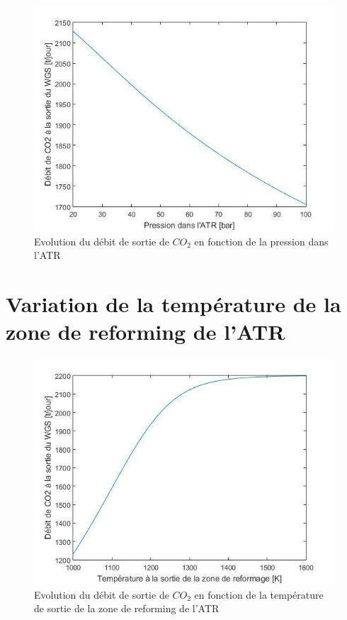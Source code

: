 \documentclass[12pt]{report}
\begin{document}
\begin{figure}[H]
\begin{center}
\includegraphics[scale=0.6]{debit_CO2_pression_ATR}
\caption{Evolution du débit de sortie de $CO_2$ en fonction de la pression dans l'ATR}
\end{center}
\end{figure}
 






\section{Variation de la température de la zone de reforming de l'ATR}



\begin{figure}[H]
\begin{center}
\includegraphics[scale=0.6]{debit_CO2_Temperature}
\caption{Evolution du débit de sortie de $CO_2$ en fonction de la température de sortie de la zone de reforming de l'ATR}
\end{center}
\end{figure}
\end{document}
